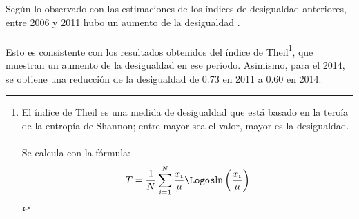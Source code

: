   Según lo observado con las estimaciones de los índices de desigualdad anteriores, entre 2006 y 2011 hubo  un aumento de la desigualdad .\\ \\ 
 Esto es consistente con los resultados obtenidos del índice de Theil\footnote{El índice de Theil es una medida de desigualdad que está basado en la teroía de la entropía de Shannon; entre mayor sea el valor, mayor es la desigualdad. \\\\ Se calcula con la fórmula: \[ T =\frac{1}{N} \sum_{i=1}^{N}\frac{x_i}{\mu}\Logos\mbox{ln} \left(\frac{x_i}{\mu}\right) \]}, que muestran un aumento de la desigualdad en ese período. Asimismo, para el 2014, se obtiene una reducción de la desigualdad de 0.73 en 2011 a 0.60 en 2014.